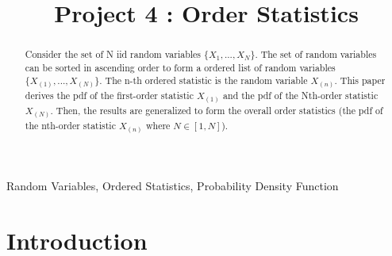 \documentclass[conference]{IEEEtran}
\begin{document}
\title{Project 4 : Order Statistics}

\author{
}
\maketitle

\begin{abstract}
Consider the set of N iid random variables $\{X_1,...,X_N\}$. The set of random variables can be sorted in ascending order to form a ordered list of random variables $\{X_{(1)},...,X_{(N)}\}$. The n-th ordered statistic is the random variable $X_{(n)}$. This paper derives the pdf of the first-order statistic $X_{(1)}$ and the pdf of the Nth-order statistic $X_{(N)}$. Then, the results are generalized to form the overall order statistics (the pdf of the nth-order statistic $X_{(n)}$ where $N\in [1, N]$).
\end{abstract}

\begin{IEEEkeywords}
Random Variables, Ordered Statistics, Probability Density Function
\end{IEEEkeywords}

\section{Introduction}

%
\end{document}
